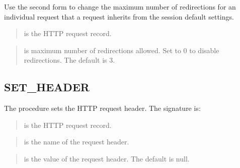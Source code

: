 \documentclass[letterpaper,10pt,english,openany,oneside]{sphinxmanual}
\begin{document}
Use the second form to change the maximum number of redirections for an
individual request that a request inherits from the session default
settings.


\begin{quote}

 is the HTTP request record.
\end{quote}

\begin{quote}

 is maximum number of redirections allowed. Set to 0
to disable redirections. The default is 3.
\end{quote}


\subsection{SET\_HEADER}
\label{\detokenize{utl_http:set-header}}
The  procedure sets the HTTP request header. The signature
is:
\begin{quote}

\begin{DUlineblock}{0em}
\item[] 
\item[] 
\end{DUlineblock}
\end{quote}


\begin{quote}

 is the HTTP request record.
\end{quote}

\begin{quote}

 is the name of the request header.
\end{quote}

\begin{quote}

 is the value of the request header. The default is null.
\end{quote}
\end{document}
